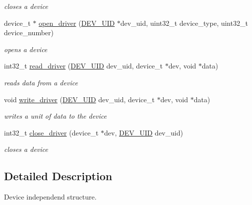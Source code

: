 \begin{CompactItemize}
\begin{CompactList}\small\item\em closes a device \item\end{CompactList}\item 
device\_\-t $\ast$ \hyperlink{group__device__driver_gf52df4f2578f48dbe154d5cb1643e7a7}{open\_\-driver} (\hyperlink{group___d_e_v_i_c_e___a_p_i_g9f427f7fc1dc07b788af60c2aaa6b8d3}{DEV\_\-UID} $\ast$dev\_\-uid, uint32\_\-t device\_\-type, uint32\_\-t device\_\-number)
\begin{CompactList}\small\item\em opens a device \item\end{CompactList}\item 
int32\_\-t \hyperlink{group__device__driver_g908734a3944d1f0d08ba5490c13e1ac6}{read\_\-driver} (\hyperlink{group___d_e_v_i_c_e___a_p_i_g9f427f7fc1dc07b788af60c2aaa6b8d3}{DEV\_\-UID} dev\_\-uid, device\_\-t $\ast$dev, void $\ast$data)
\begin{CompactList}\small\item\em reads data from a device \item\end{CompactList}\item 
void \hyperlink{group__device__driver_gc3f852bf9a4da163836eb9bdd23e6dd8}{write\_\-driver} (\hyperlink{group___d_e_v_i_c_e___a_p_i_g9f427f7fc1dc07b788af60c2aaa6b8d3}{DEV\_\-UID} dev\_\-uid, device\_\-t $\ast$dev, void $\ast$data)
\begin{CompactList}\small\item\em writes a unit of data to the device \item\end{CompactList}\item 
int32\_\-t \hyperlink{group__device__driver_g4915a14d06f79d1c5a2d72b186cee40d}{close\_\-driver} (device\_\-t $\ast$dev, \hyperlink{group___d_e_v_i_c_e___a_p_i_g9f427f7fc1dc07b788af60c2aaa6b8d3}{DEV\_\-UID} dev\_\-uid)
\begin{CompactList}\small\item\em closes a device \item\end{CompactList}\end{CompactItemize}


\subsection{Detailed Description}
Device independend structure. 


